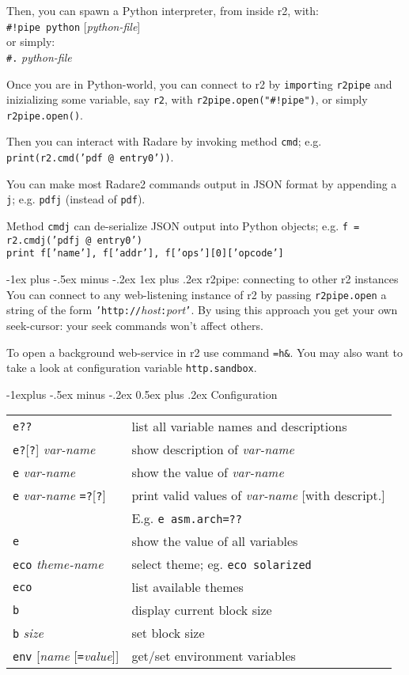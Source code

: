 \documentclass[a4paper,landscape]{article}
\makeatletter
\renewcommand{\subsection}{\@startsection{subsection}{2}{0mm}%
                                {-1explus -.5ex minus -.2ex}%
                                {0.5ex plus .2ex}%
                                {\normalfont\normalsize\bfseries}}
\renewcommand{\subsubsection}{\@startsection{subsubsection}{3}{0mm}%
                                {-1ex plus -.5ex minus -.2ex}%
                                {1ex plus .2ex}%
                                {\normalfont\small\bfseries}}
\makeatother
\begin{document}
\begin{multicols*}{3}
Then, you can spawn a Python interpreter, from inside r2, with: \\
\texttt{\#!pipe python} [\textit{python-file}] \\
or simply: \\
\texttt{\#.} \textit{python-file}

Once you are in Python-world, you can connect to r2 by \texttt{import}ing \texttt{r2pipe} and inizializing some variable,
say \texttt{r2}, with \texttt{r2pipe.open("\#!pipe")}, or simply \texttt{r2pipe.open()}.

Then you can interact with Radare by invoking method \texttt{cmd}; e.g. \texttt{print(r2.cmd('pdf @ entry0'))}.

You can make most Radare2 commands output in JSON format by appending a \texttt{j}; e.g. \texttt{pdfj} (instead of \texttt{pdf}).

Method \texttt{cmdj} can de-serialize JSON output into Python objects; e.g. \texttt{f = r2.cmdj('pdfj @ entry0')} \\ \texttt{print f['name'], f['addr'], f['ops'][0]['opcode']}

\subsubsection{r2pipe: connecting to other r2 instances}
You can connect to any web-listening instance of r2 by passing \texttt{r2pipe.open} a
string of the form \texttt{'http://}\textit{host}\texttt{:}\textit{port}\texttt{'}.
By using this approach you get your own seek-cursor: your seek commands won't affect
others.

To open a background web-service in r2 use command \texttt{=h\&}. You may also want to 
take a look at configuration variable \texttt{http.sandbox}.

\subsection{Configuration}
\begin{tabular}{@{}ll@{}}
\texttt{e??} & list all variable names and descriptions \\
\texttt{e?}[\texttt{?}] \textit{var-name} & show description of \textit{var-name}\\
\texttt{e} \textit{var-name} & show the value of \textit{var-name} \\
\texttt{e} \textit{var-name} \texttt{=?}[\texttt{?}]& print valid values of \textit{var-name} [with descript.]\\
	& E.g. \texttt{e asm.arch=??} \\
\texttt{e} & show the value of all variables \\
\texttt{eco} \textit{theme-name} & select theme; eg. \texttt{eco solarized} \\
\texttt{eco} & list available themes \\
\texttt{b} & display current block size \\
\texttt{b} \textit{size} & set block size \\
\texttt{env} [\textit{name} [\texttt{=}\textit{value}]] & get/set environment variables \\
\end{tabular}

\end{multicols*}
\end{document}
